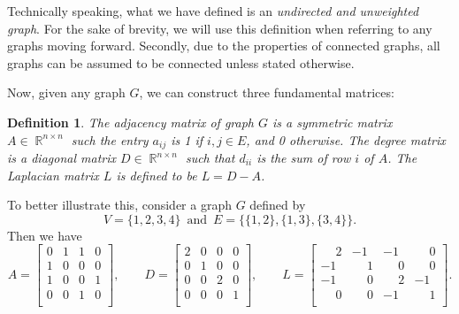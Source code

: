 \documentclass[11pt, letterpaper]{article}
\DeclareMathOperator{\R}{\mathbb{R}}
\theoremstyle{perchance}
\newtheorem*{definition}{Definition}
\begin{document}
        \vspace{-3mm}
        
        Technically speaking, what we have defined is an \emph{undirected and unweighted graph}. For the sake of brevity, we will use this definition when referring to any graphs moving forward. Secondly, due to the properties of connected graphs, all graphs can be assumed to be connected unless stated otherwise.
        
        Now, given any graph $G$, we can construct three fundamental matrices:
        
        \begin{definition}
            The \emph{adjacency} matrix of graph $G$ is a symmetric matrix $A \in \R^{n \times n}$ such the entry $a_{ij}$ is 1 if ${i, j} \in E$, and 0 otherwise. The \emph{degree} matrix is a diagonal matrix $D \in \R^{n \times n}$ such that $d_{ii}$ is the sum of row $i$ of $A$. The \emph{Laplacian} matrix $L$ is defined to be $L = D - A$.
        \end{definition}
        
        \vspace{-3mm}
    
        To better illustrate this, consider a graph $G$ defined by 
        \[V = \{1, 2, 3, 4\} \,\text{ and }\, E = \{\{1, 2\}, \{1, 3\}, \{3, 4\}\}.\] 
        Then we have
        \[A = 
        \begin{bmatrix}
        0 & 1 & 1 & 0 \\
        1 & 0 & 0 & 0 \\
        1 & 0 & 0 & 1 \\
        0 & 0 & 1 & 0 \\
        \end{bmatrix}, \qquad D = \begin{bmatrix}
        2 & 0 & 0 & 0 \\
        0 & 1 & 0 & 0 \\
        0 & 0 & 2 & 0 \\
        0 & 0 & 0 & 1 \\
        \end{bmatrix}, \qquad L = \begin{bmatrix}
        \phantom{-}2 & -1 & -1 & \phantom{-}0 \\
        -1 & \phantom{-}1 & \phantom{-}0 & \phantom{-}0 \\
        -1 & \phantom{-}0 & \phantom{-}2 & -1 \\
        \phantom{-}0 & \phantom{-}0 & -1 & \phantom{-}1 \\
        \end{bmatrix}. \]
    
\end{document}
